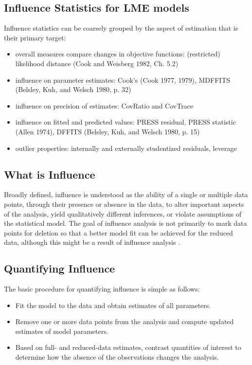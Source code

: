 \documentclass[Main.tex]{subfiles}
\begin{document}
\subsection{Influence Statistics for LME models} %
Influence statistics can be coarsely grouped by the aspect of estimation that is their primary target:
\begin{itemize}
	\item overall measures compare changes in objective functions: (restricted) likelihood distance (Cook and Weisberg 1982, Ch. 5.2)
	\item influence on parameter estimates: Cook's  (Cook 1977, 1979), MDFFITS (Belsley, Kuh, and Welsch 1980, p. 32)
	\item influence on precision of estimates: CovRatio and CovTrace
	\item influence on fitted and predicted values: PRESS residual, PRESS statistic (Allen 1974), DFFITS (Belsley, Kuh, and Welsch 1980, p. 15)
	\item outlier properties: internally and externally studentized residuals, leverage
\end{itemize}


\subsection{What is Influence} %

Broadly defined, influence is understood as the ability of a single or multiple data points, through their presence or absence in the data, to alter important aspects of the analysis, yield qualitatively different inferences, or violate assumptions of the statistical model. The goal of influence analysis is not primarily to mark data
points for deletion so that a better model fit can be achieved for the reduced data, although this might be a result of influence analysis \citep{schabenberger}.

\subsection{Quantifying Influence}  %

The basic procedure for quantifying influence is simple as follows:

\begin{itemize}
	\item Fit the model to the data and obtain estimates of all parameters.
	\item Remove one or more data points from the analysis and compute updated estimates of model parameters.
	\item Based on full- and reduced-data estimates, contrast quantities of interest to determine how the absence of the observations changes the analysis.
\end{itemize}
\end{document}
